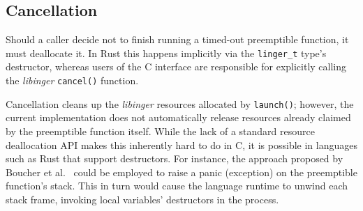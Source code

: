 \subsection{Cancellation}

Should a caller decide not to finish running a timed-out preemptible function, it
must deallocate it.  In Rust this happens implicitly via the \texttt{linger\_t}
type's destructor, whereas users of the C interface are responsible for explicitly
calling the \textit{libinger} \texttt{cancel()} function.

Cancellation cleans up the \textit{libinger} resources allocated by
\texttt{launch()};
however, the current implementation
does not automatically release resources already claimed by the
preemptible function itself.  While the lack of a standard resource deallocation API
makes this inherently hard to do in C, it is possible in languages
such as Rust that support destructors.  For instance, the approach proposed by
Boucher et al.~\cite{boucher:atc2018} could be employed to raise a panic
(exception) on the preemptible function's stack.  This in turn would cause the
language runtime
to unwind each stack frame, invoking local variables' destructors in
the process.

